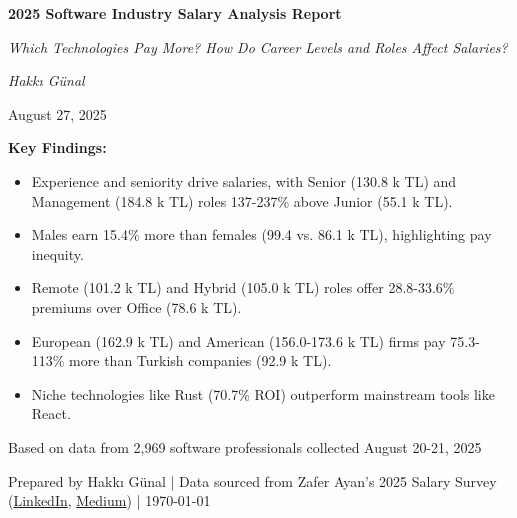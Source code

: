 \documentclass[12pt,a4paper]{article}
\begin{document}
\begin{titlepage}
    \centering
    \vfill
    \vspace*{1.5cm}
    \vspace{1cm}
    {\Huge \bfseries \color{titleblue} 2025 Software Industry Salary Analysis Report\par}
    \vspace{0.5cm}
    {\Large \itshape \color{darkgray} Which Technologies Pay More? How Do Career Levels and Roles Affect Salaries?\par}
    \vspace{1cm}
    {\Large \itshape Hakkı Günal\par}
    \vspace{0.5cm}
    {\large August 27, 2025\par}
    \vspace{1cm}
    {\normalsize
        \begin{minipage}{0.8\textwidth}
            \centering
            \color{darkgray}
            \textbf{Key Findings:}
            \begin{itemize}
                \item Experience and seniority drive salaries, with Senior (130.8 k TL) and Management (184.8 k TL) roles 137-237\% above Junior (55.1 k TL).
                \item Males earn 15.4\% more than females (99.4 vs. 86.1 k TL), highlighting pay inequity.
                \item Remote (101.2 k TL) and Hybrid (105.0 k TL) roles offer 28.8-33.6\% premiums over Office (78.6 k TL).
                \item European (162.9 k TL) and American (156.0-173.6 k TL) firms pay 75.3-113\% more than Turkish companies (92.9 k TL).
                \item Niche technologies like Rust (70.7\% ROI) outperform mainstream tools like React.
            \end{itemize}
        \end{minipage}
    \par}
    \vspace{1cm}
    {\normalsize \color{darkgray} Based on data from 2,969 software professionals collected August 20-21, 2025\par}
    \vspace{0.5cm}
    {\small \color{darkgray} Prepared by Hakkı Günal | Data sourced from Zafer Ayan's 2025 Salary Survey (\href{https://www.linkedin.com/posts/zaferayan_geleneksel-maa%C5%9F-anketi-buyrun-httpslnkdin-activity-7363866008664629248-7YcQ}{LinkedIn}, \href{https://zaferayan.medium.com/2025-a%C4%9Fustos-detayl%C4%B1-maa%C5%9F-anketi-98446d71920a}{Medium}) | \today}
    \vfill
\end{titlepage}
\end{document}
